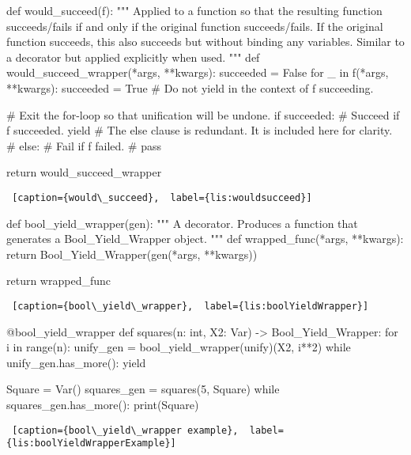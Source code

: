 \noindent
\begin{minipage}{\linewidth}  \largev 
\begin{python}[numbers=left]
def would_succeed(f):
  """
  Applied to a function so that the resulting function succeeds/fails if and only if the original
  function succeeds/fails. If the original function succeeds, this also succeeds but without 
  binding any variables. Similar to a decorator but applied explicitly when used.
  """
  def would_succeed_wrapper(*args, **kwargs):
    succeeded = False
    for _ in f(*args, **kwargs):
      succeeded = True
      # Do not yield in the context of f succeeding.
      
    # Exit the for-loop so that unification will be undone.
    if succeeded:
      # Succeed if f succeeded.
      yield  
    # The else clause is redundant. It is included here for clarity.
    # else:
    #   Fail if f failed.
    #   pass   

  return would_succeed_wrapper

\end{python}
\begin{lstlisting} [caption={would\_succeed},  label={lis:wouldsucceed}]
\end{lstlisting}
\end{minipage}

\noindent
\begin{minipage}{\linewidth}  \largev 
\begin{python}[numbers=left]
def bool_yield_wrapper(gen):
  """
  A decorator. Produces a function that generates a Bool_Yield_Wrapper object. 
  """
  def wrapped_func(*args, **kwargs):
    return Bool_Yield_Wrapper(gen(*args, **kwargs))

  return wrapped_func
\end{python}
\begin{lstlisting} [caption={bool\_yield\_wrapper},  label={lis:boolYieldWrapper}]
\end{lstlisting}
\end{minipage}


\noindent
\begin{minipage}{\linewidth}  \largev 
\begin{python}[numbers=left]
  @bool_yield_wrapper
  def squares(n: int, X2: Var) -> Bool_Yield_Wrapper:
    for i in range(n):
      unify_gen = bool_yield_wrapper(unify)(X2, i**2)
      while unify_gen.has_more():
        yield

  Square = Var()
  squares_gen = squares(5, Square)
  while squares_gen.has_more():
    print(Square)
\end{python}
\begin{lstlisting} [caption={bool\_yield\_wrapper example},  label={lis:boolYieldWrapperExample}]
\end{lstlisting}
\end{minipage}


